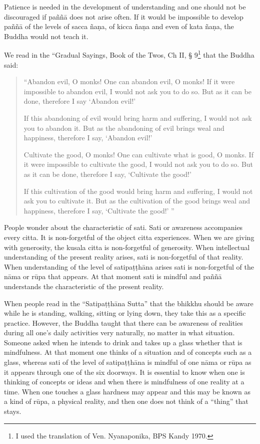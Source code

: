 Patience is needed in the development of understanding and one should
not be discouraged if paññā does not arise often. If it would be
impossible to develop paññā of the levels of sacca ñaṇa, of kicca ñaṇa
and even of kata ñaṇa, the Buddha would not teach it.

We read in the ``Gradual Sayings, Book of the Twos, Ch II, §
9\footnote{I used the translation
of Ven. Nyanaponika, BPS Kandy 1970.} that the Buddha said:

\begin{quote}
``Abandon evil, O monks! One can abandon evil, O monks! If it were
impossible to abandon evil, I would not ask you to do so. But as it can
be done, therefore I say `Abandon evil!'

If this abandoning of evil would bring harm and suffering, I would not
ask you to abandon it. But as the abandoning of evil brings weal and
happiness, therefore I say, `Abandon evil!'

Cultivate the good, O monks! One can cultivate what is good, O monks. If
it were impossible to cultivate the good, I would not ask you to do so.
But as it can be done, therefore I say, `Cultivate the good!'

If this cultivation of the good would bring harm and suffering, I would
not ask you to cultivate it. But as the cultivation of the good brings
weal and happiness, therefore I say, `Cultivate the good!' ''
\end{quote}

People wonder about the characteristic of sati. Sati or awareness
accompanies every citta. It is non-forgetful of the object citta
experiences. When we are giving with generosity, the kusala citta is
non-forgetful of generosity. When intellectual understanding of the
present reality arises, sati is non-forgetful of that reality. When
understanding of the level of satipaṭṭhāna arises sati is non-forgetful
of the nāma or rūpa that appears. At that moment sati is mindful and
paññā understands the characteristic of the present reality.

When people read in the ``Satipaṭṭhāna Sutta'' that the bhikkhu should
be aware while he is standing, walking, sitting or lying down, they take
this as a specific practice. However, the Buddha taught that there can
be awareness of realities during all one's daily activities very
naturally, no matter in what situation. Someone asked when he intends to
drink and takes up a glass whether that is mindfulness. At that moment
one thinks of a situation and of concepts such as a glass, whereas sati
of the level of satipaṭṭhāna is mindful of one nāma or rūpa as it
appears through one of the six doorways. It is essential to know when
one is thinking of concepts or ideas and when there is mindfulness of
one reality at a time. When one touches a glass hardness may appear and
this may be known as a kind of rūpa, a physical reality, and then one
does not think of a ``thing'' that stays.

